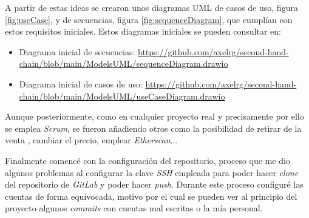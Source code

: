 
A partir de estas ideas se crearon unos diagramas UML de casos de uso, figura \ref{fig:useCase}, y de secuencias, figura \ref{fig:sequenceDiagram}, que cumplían con estos requisitos iniciales. Estos diagramas iniciales se pueden consultar en:
\begin{itemize}
    \item Diagrama inicial de secuencias: \url{https://github.com/axelrg/second-hand-chain/blob/main/ModelsUML/sequenceDiagram.drawio}
    \item Diagrama inicial de casos de uso: \url{https://github.com/axelrg/second-hand-chain/blob/main/ModelsUML/useCaseDiagram.drawio}
\end{itemize}
Aunque posteriormente, como en cualquier proyecto real y precisamente por ello se emplea \textit{Scrum}, se fueron añadiendo otros como la posibilidad de retirar de la venta , cambiar el precio, emplear \textit{Etherscan}...

Finalmente comencé con la configuración del repositorio, proceso que me dio algunos problemas al configurar la clave \textit{SSH} empleada para poder hacer \textit{clone} del repositorio de \textit{GitLab} y poder hacer \textit{push}. Durante este proceso configuré las cuentas de forma equivocada, motivo por el cual se pueden ver al principio del proyecto algunos \textit{commits} con cuentas mal escritas o la mía personal.

